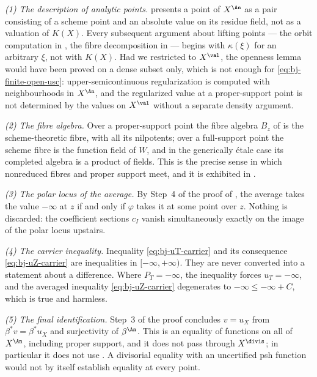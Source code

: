 \emph{(1) The description of analytic points.}
 presents a point of $X^{\An}$ as a pair
consisting of a scheme point and an absolute value on its residue field, not
as a valuation of $K(X)$.  Every subsequent argument about lifting points
--- the orbit computation in , the fibre
decomposition in  --- begins with
$\kappa(\xi)$ for an arbitrary $\xi$, not with $K(X)$.  Had we
restricted to $X^{\val}$, the openness lemma would have been proved on a
dense subset only, which is not enough for
\eqref{eq:bj-finite-open-usc}: upper-semicontinuous regularization is
computed with neighbourhoods in $X^{\An}$, and the regularized value at a
proper-support point is not determined by the values on $X^{\val}$
without a separate density argument.

\emph{(2) The fibre algebra.}
Over a proper-support point the fibre algebra $B_z$ of
 is the scheme-theoretic fibre, with all its
nilpotents; over a full-support point the scheme fibre is the function field
of $W$, and in the generically étale case its completed algebra is
a product of fields.  This is the precise sense in which nonreduced fibres and
proper support meet, and it is exhibited in
.

\emph{(3) The polar locus of the average.}
By Step~4 of the proof of , the
average takes the value $-\infty$ at $z$ if and only if $\varphi$
takes it at some point over $z$.  Nothing is discarded: the coefficient
sections $c_I$ vanish simultaneously exactly on the image of the polar
locus upstairs.

\emph{(4) The carrier inequality.}
Inequality \eqref{eq:bj-uT-carrier} and its consequence
\eqref{eq:bj-uZ-carrier} are inequalities in $[-\infty,+\infty)$.  They
are never converted into a statement about a difference.  Where
$P_T=-\infty$, the inequality forces $u_T=-\infty$, and the averaged
inequality \eqref{eq:bj-uZ-carrier} degenerates to
$-\infty\le-\infty+C$, which is true and harmless.

\emph{(5) The final identification.}
Step~3 of the proof concludes $v=u_X$ from $\beta^*v=\beta^*u_X$ and
surjectivity of $\beta^{\An}$.  This is an equality of functions on all of
$X^{\An}$, including proper support, and it does not pass through
$X^{\divis}$; in particular it does not use
.  A divisorial equality with
an uncertified psh function would not by itself establish equality
at every point.

